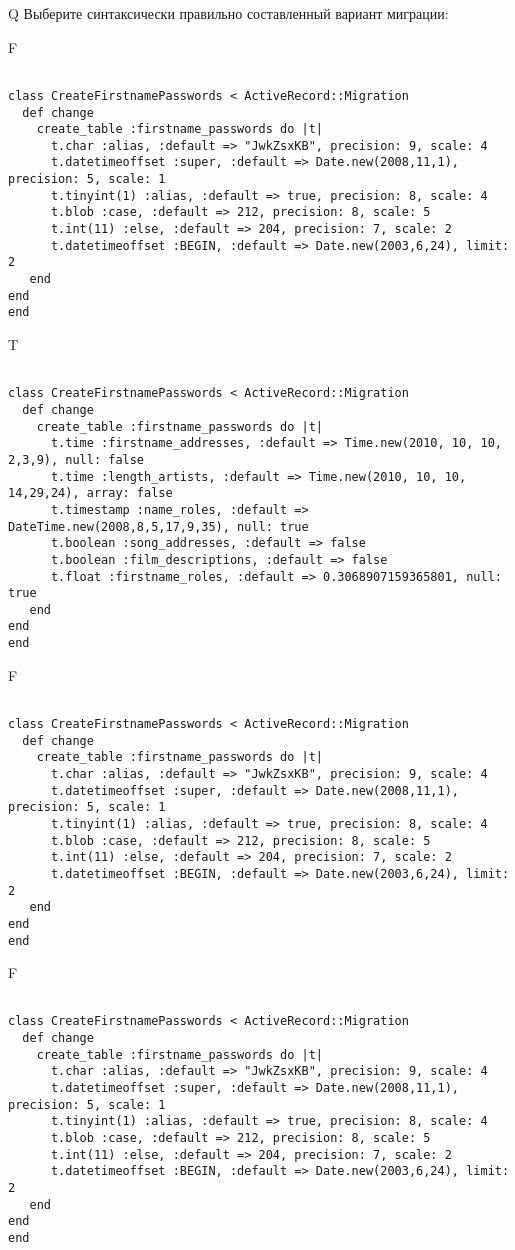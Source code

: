 Q
Выберите синтаксически правильно составленный вариант миграции:

F
\begin{verbatim}
		
class CreateFirstnamePasswords < ActiveRecord::Migration 
  def change 
    create_table :firstname_passwords do |t| 
      t.char :alias, :default => "JwkZsxKB", precision: 9, scale: 4
      t.datetimeoffset :super, :default => Date.new(2008,11,1), precision: 5, scale: 1
      t.tinyint(1) :alias, :default => true, precision: 8, scale: 4
      t.blob :case, :default => 212, precision: 8, scale: 5
      t.int(11) :else, :default => 204, precision: 7, scale: 2
      t.datetimeoffset :BEGIN, :default => Date.new(2003,6,24), limit: 2
   end
end
end
\end{verbatim}

T
\begin{verbatim}
		
class CreateFirstnamePasswords < ActiveRecord::Migration 
  def change 
    create_table :firstname_passwords do |t| 
      t.time :firstname_addresses, :default => Time.new(2010, 10, 10, 2,3,9), null: false
      t.time :length_artists, :default => Time.new(2010, 10, 10, 14,29,24), array: false
      t.timestamp :name_roles, :default => DateTime.new(2008,8,5,17,9,35), null: true
      t.boolean :song_addresses, :default => false
      t.boolean :film_descriptions, :default => false
      t.float :firstname_roles, :default => 0.3068907159365801, null: true
   end
end
end
\end{verbatim}

F
\begin{verbatim}
		
class CreateFirstnamePasswords < ActiveRecord::Migration 
  def change 
    create_table :firstname_passwords do |t| 
      t.char :alias, :default => "JwkZsxKB", precision: 9, scale: 4
      t.datetimeoffset :super, :default => Date.new(2008,11,1), precision: 5, scale: 1
      t.tinyint(1) :alias, :default => true, precision: 8, scale: 4
      t.blob :case, :default => 212, precision: 8, scale: 5
      t.int(11) :else, :default => 204, precision: 7, scale: 2
      t.datetimeoffset :BEGIN, :default => Date.new(2003,6,24), limit: 2
   end
end
end
\end{verbatim}

F
\begin{verbatim}
		
class CreateFirstnamePasswords < ActiveRecord::Migration 
  def change 
    create_table :firstname_passwords do |t| 
      t.char :alias, :default => "JwkZsxKB", precision: 9, scale: 4
      t.datetimeoffset :super, :default => Date.new(2008,11,1), precision: 5, scale: 1
      t.tinyint(1) :alias, :default => true, precision: 8, scale: 4
      t.blob :case, :default => 212, precision: 8, scale: 5
      t.int(11) :else, :default => 204, precision: 7, scale: 2
      t.datetimeoffset :BEGIN, :default => Date.new(2003,6,24), limit: 2
   end
end
end
\end{verbatim}

